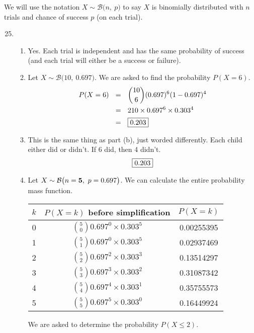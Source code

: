 \documentclass[12pt,letterpaper]{article}
\begin{document}
\newcommand{\N}[2]{\mathcal{N}\big(#1,~#2\big)}
\newcommand{\Geo}[1]{\texttt{Geo}\big(#1\big)}
\newcommand{\B}[2]{\mathcal{B}\big(#1,~#2\big)}
\newcommand{\AND}{\textsc{~and~}}
\newcommand{\OR}{\textsc{~or~}}

We will use the notation $X\sim \B{n}{p}$ to say $X$ is binomially distributed with $n$ trials and chance of success $p$ (on each trial). 

\begin{enumerate}
\setcounter{enumi}{24}
\item \begin{enumerate}
\item Yes. Each trial is independent and has the same probability of success (and each trial will either be a success or failure).
\item Let $X\sim \B{10}{0.697}$. We are asked to find the probability $P(X=6)$.
\begin{align*}
P(X=6) ~~&=~~ {10\choose 6} (0.697)^6(1-0.697)^4 \\
&=~~ 210 \times 0.697^6 \times 0.303^4 \\
&=~~ \fbox{0.203}
\end{align*}
\item This is the same thing as part (b), just worded differently. Each child either did or didn't. If 6 did, then 4 didn't.
$$\fbox{0.203} $$
\item Let $X\sim \B{{n=\bf 5}}{p=0.697}$. We can calculate the entire probability mass function.
\begin{center}
\renewcommand{\arraystretch}{1.5}
\begin{tabular}{|c|c|c|}\hline
$k$ & $P(X=k)$ before simplification & $P(X=k)$ \\ \hline
0  & ${5\choose 0} 0.697^0 \times0.303^5$ & 0.00255395 \\
1  & ${5\choose 1} 0.697^0 \times 0.303^5 $ & 0.02937469 \\
2  & ${5\choose 2} 0.697^2 \times 0.303^3$ & 0.13514297 \\
3  & ${5\choose 3} 0.697^3 \times 0.303^2$ & 0.31087342 \\
4  & ${5\choose 4} 0.697^4 \times 0.303^1$ & 0.35755573 \\
5  & ${5\choose 5} 0.697^5 \times 0.303^0$ & 0.16449924 \\ \hline
\end{tabular}
\end{center}
We are asked to determine the probability $P(X\le 2)$.
\begin{align*}

\end{align*}
\end{enumerate}
\end{enumerate}
\end{document}
